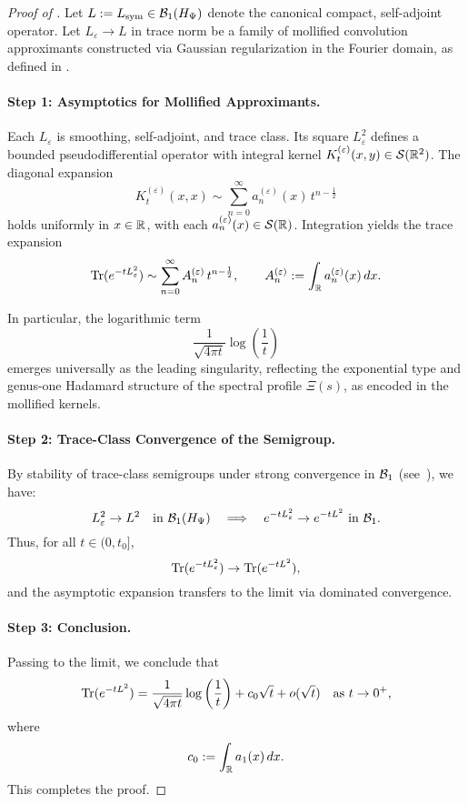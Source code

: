 \begin{proof}[Proof of ]
Let \( L := L_{\mathrm{sym}} \in \mathcal{B}_1(H_{\Psi}) \) denote the canonical compact, self-adjoint operator. Let \( L_\varepsilon \to L \) in trace norm be a family of mollified convolution approximants constructed via Gaussian regularization in the Fourier domain, as defined in .

\paragraph{Step 1: Asymptotics for Mollified Approximants.}
Each \( L_\varepsilon \) is smoothing, self-adjoint, and trace class. Its square \( L_\varepsilon^2 \) defines a bounded pseudodifferential operator with integral kernel \( K^{(\varepsilon)}_t(x,y) \in \mathcal{S}(\mathbb{R}^2) \). The diagonal expansion
\[
K^{(\varepsilon)}_t(x,x) \sim \sum_{n=0}^\infty a_n^{(\varepsilon)}(x)\, t^{n - \frac{1}{2}}
\]
holds uniformly in \( x \in \mathbb{R} \), with each \( a_n^{(\varepsilon)}(x) \in \mathcal{S}(\mathbb{R}) \). Integration yields the trace expansion
\[
\operatorname{Tr}(e^{-t L_\varepsilon^2}) \sim \sum_{n=0}^\infty A_n^{(\varepsilon)}\, t^{n - \frac{1}{2}}, \qquad A_n^{(\varepsilon)} := \int_{\mathbb{R}} a_n^{(\varepsilon)}(x)\, dx.
\]

In particular, the logarithmic term
\[
\frac{1}{\sqrt{4\pi t}} \log\left( \frac{1}{t} \right)
\]
emerges universally as the leading singularity, reflecting the exponential type and genus-one Hadamard structure of the spectral profile \( \Xi(s) \), as encoded in the mollified kernels.

\paragraph{Step 2: Trace-Class Convergence of the Semigroup.}
By stability of trace-class semigroups under strong convergence in \( \mathcal{B}_1 \) (see~\cite[Thm.~3.2]{Simon2005TraceIdeals}), we have:
\[
L_\varepsilon^2 \to L^2 \quad \text{in } \mathcal{B}_1(H_{\Psi}) \quad \Longrightarrow \quad e^{-t L_\varepsilon^2} \to e^{-t L^2} \text{ in } \mathcal{B}_1.
\]
Thus, for all \( t \in (0, t_0] \),
\[
\operatorname{Tr}(e^{-t L_\varepsilon^2}) \to \operatorname{Tr}(e^{-t L^2}),
\]
and the asymptotic expansion transfers to the limit via dominated convergence.

\paragraph{Step 3: Conclusion.}
Passing to the limit, we conclude that
\[
\operatorname{Tr}(e^{-t L^2}) = \frac{1}{\sqrt{4\pi t}} \log\left( \frac{1}{t} \right) + c_0 \sqrt{t} + o(\sqrt{t}) \quad \text{as } t \to 0^+,
\]
where
\[
c_0 := \int_{\mathbb{R}} a_1(x) \, dx.
\]
This completes the proof.
\end{proof}
